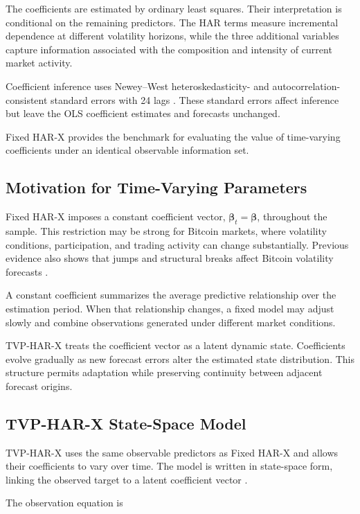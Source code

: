 The coefficients are estimated by ordinary least squares.
Their interpretation is conditional on the remaining
predictors. The HAR terms measure incremental dependence at
different volatility horizons, while the three additional
variables capture information associated with the composition
and intensity of current market activity.

Coefficient inference uses Newey--West
heteroskedasticity- and autocorrelation-consistent standard
errors with 24 lags \citep{neweywest1987}. These standard
errors affect inference but leave the OLS coefficient estimates
and forecasts unchanged.

Fixed HAR-X provides the benchmark for evaluating the value of
time-varying coefficients under an identical observable
information set.

\subsection{Motivation for Time-Varying Parameters}

Fixed HAR-X imposes a constant coefficient vector,
\(\boldsymbol{\beta}_t=\boldsymbol{\beta}\), throughout the
sample. This restriction may be strong for Bitcoin markets,
where volatility conditions, participation, and trading
activity can change substantially. Previous evidence also
shows that jumps and structural breaks affect Bitcoin
volatility forecasts \citep{shen2020}.

A constant coefficient summarizes the average predictive
relationship over the estimation period. When that
relationship changes, a fixed model may adjust slowly and
combine observations generated under different market
conditions.

TVP-HAR-X treats the coefficient vector as a latent dynamic
state. Coefficients evolve gradually as new forecast errors
alter the estimated state distribution. This structure permits
adaptation while preserving continuity between adjacent
forecast origins.

\subsection{TVP-HAR-X State-Space Model}

TVP-HAR-X uses the same observable predictors as Fixed HAR-X
and allows their coefficients to vary over time. The model is
written in state-space form, linking the observed target to a
latent coefficient vector \citep{durbin2012}.

The observation equation is

